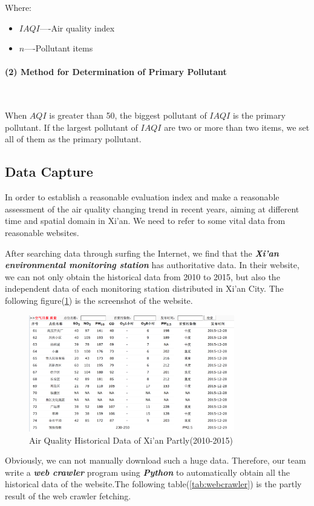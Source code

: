 \documentclass[a4paper,11pt]{article}
\begin{document}
Where:
\begin{itemize}
\item $IAQI$----Air quality index
\item $n$----Pollutant items
\end{itemize}

\paragraph {(2) Method for Determination of Primary Pollutant}
\textrm{\\}
\par When $AQI$ is greater than 50, the biggest pollutant of $IAQI$ is the primary pollutant. If the largest pollutant of $IAQI$ are two or more than two items, we set all of them as the primary pollutant.

\subsection{Data Capture}
\par In order to establish a reasonable evaluation index and make a reasonable assessment of the air quality changing trend in recent years, aiming at different time and spatial domain in Xi'an. We need to refer to some vital data from reasonable websites.
\par After searching data through surfing the Internet, we find that the \textbf{\emph{Xi'an environmental monitoring station}} \cite{RB} has authoritative data. In their website, we can not only obtain the historical data from 2010 to 2015, but also the independent data of each monitoring station distributed in Xi'an City. The following figure(\ref{fig:XianAQI}) is the screenshot of the website.
\begin{figure}[h]%
\centering %
\includegraphics[width=0.8\textwidth]{./Pic/XianAQI.png}
\caption{Air Quality Historical Data of Xi'an Partly(2010-2015)} 
\label{fig:XianAQI}  
\end{figure}
\par Obviously, we can not manually download such a huge data. Therefore, our team write a \textbf{\emph{web crawler}} program using \textbf{\emph{Python} }to automatically obtain all the historical data of the website.The following table(\ref{tab:webcrawler}) is the partly result of the web crawler fetching.
\end{document}
